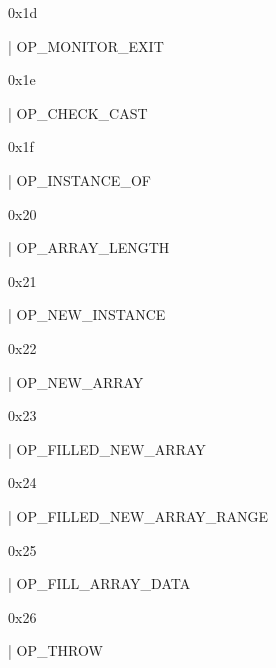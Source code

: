 \documentclass[11pt]{article}
\begin{document}
\begin{ocamldoccomment}
0x1d
\end{ocamldoccomment}
\begin{ocamldoccode}
  | OP_MONITOR_EXIT
\end{ocamldoccode}
\begin{ocamldoccomment}
0x1e
\end{ocamldoccomment}
\begin{ocamldoccode}
  | OP_CHECK_CAST
\end{ocamldoccode}
\begin{ocamldoccomment}
0x1f
\end{ocamldoccomment}
\begin{ocamldoccode}
  | OP_INSTANCE_OF
\end{ocamldoccode}
\begin{ocamldoccomment}
0x20
\end{ocamldoccomment}
\begin{ocamldoccode}
  | OP_ARRAY_LENGTH
\end{ocamldoccode}
\begin{ocamldoccomment}
0x21
\end{ocamldoccomment}
\begin{ocamldoccode}
  | OP_NEW_INSTANCE
\end{ocamldoccode}
\begin{ocamldoccomment}
0x22
\end{ocamldoccomment}
\begin{ocamldoccode}
  | OP_NEW_ARRAY
\end{ocamldoccode}
\begin{ocamldoccomment}
0x23
\end{ocamldoccomment}
\begin{ocamldoccode}
  | OP_FILLED_NEW_ARRAY
\end{ocamldoccode}
\begin{ocamldoccomment}
0x24
\end{ocamldoccomment}
\begin{ocamldoccode}
  | OP_FILLED_NEW_ARRAY_RANGE
\end{ocamldoccode}
\begin{ocamldoccomment}
0x25
\end{ocamldoccomment}
\begin{ocamldoccode}
  | OP_FILL_ARRAY_DATA
\end{ocamldoccode}
\begin{ocamldoccomment}
0x26
\end{ocamldoccomment}
\begin{ocamldoccode}
  | OP_THROW
\end{ocamldoccode}
\end{document}
